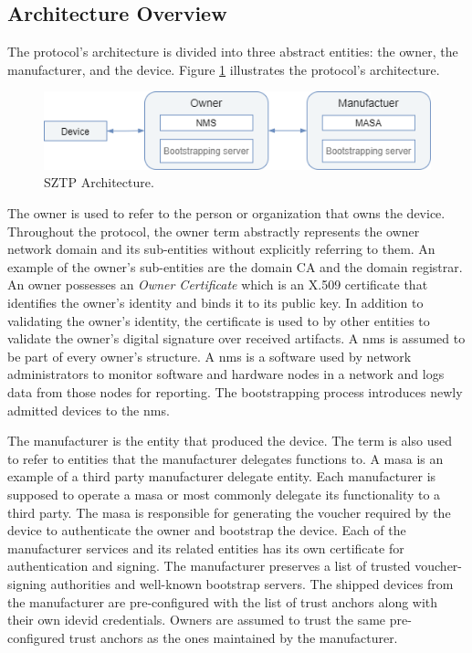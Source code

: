 \subsection{Architecture Overview}
The protocol's architecture is divided into three abstract entities: the owner, the manufacturer, and the device. Figure \ref{sztp-architecture} illustrates the protocol's architecture.
\begin{figure}[H]
	\centering
	\includegraphics[scale=0.4]{Images/sztp-overview.png}
	\caption{SZTP Architecture.}
	\label{sztp-architecture}
\end{figure}
The owner is used to refer to the person or organization that owns the device. Throughout the protocol, the owner term abstractly represents the owner network domain and its sub-entities without explicitly referring to them. An example of the owner's sub-entities are the domain CA and the domain registrar. An owner possesses an \textit{Owner Certificate} which is an X.509 certificate that identifies the owner's identity and binds it to its public key. In addition to validating the owner's identity, the certificate is used to by other entities to validate the owner's digital signature over received artifacts. A \gls{nms} is assumed to be part of every owner's structure. A \gls{nms} is a software used by network administrators to monitor software and hardware nodes in a network and logs data from those nodes for reporting. The bootstrapping process introduces newly admitted devices to the \gls{nms}. 
\par
The manufacturer is the entity that produced the device. The term is also used to refer to entities that the manufacturer delegates functions to. A \gls{masa} is an example of a third party manufacturer delegate entity. Each manufacturer is supposed to operate a \gls{masa} or most commonly delegate its functionality to a third party. The \gls{masa} is responsible for generating the voucher required by the device to authenticate the owner and bootstrap the device. Each of the manufacturer services and its related entities has its own certificate for authentication and signing. The manufacturer preserves a list of trusted voucher-signing authorities and well-known bootstrap servers. The shipped devices from the manufacturer are pre-configured with the list of trust anchors along with their own \gls{idevid} credentials. Owners are assumed to trust the same pre-configured trust anchors as the ones maintained by the manufacturer.
